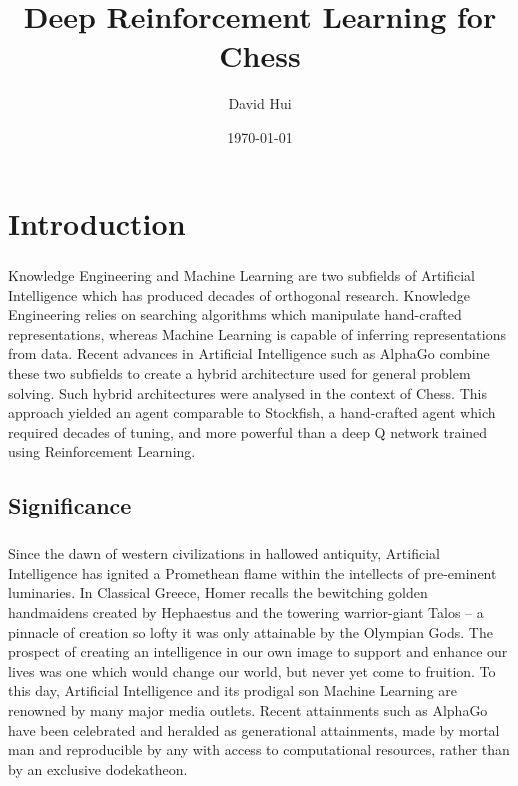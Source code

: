 \documentclass[a4paper]{book}
\title{Deep Reinforcement Learning for Chess}
\date{\today}
\author{David Hui}
\begin{document}
\maketitle
\tableofcontents


\chapter{Introduction}

\paragraph{} Knowledge Engineering and Machine Learning are two subfields of Artificial Intelligence which has produced decades of orthogonal research. Knowledge Engineering relies on searching algorithms which manipulate hand-crafted representations, whereas Machine Learning is capable of inferring representations from data. Recent advances in Artificial Intelligence such as AlphaGo combine these two subfields to create a hybrid architecture used for general problem solving. Such hybrid architectures were analysed in the context of Chess. This approach yielded an agent comparable to Stockfish, a hand-crafted agent which required decades of tuning, and more powerful than a deep Q network trained using Reinforcement Learning.

\section{Significance}

\paragraph{}

\paragraph{} Since the dawn of western civilizations in hallowed antiquity, Artificial Intelligence has ignited a Promethean flame within the intellects of pre-eminent luminaries. In Classical Greece, Homer recalls the bewitching golden handmaidens created by Hephaestus and the towering warrior-giant Talos -- a pinnacle of creation so lofty it was only attainable by the Olympian Gods. The prospect of creating an intelligence in our own image to support and enhance our lives was one which would change our world, but never yet come to fruition. To this day, Artificial Intelligence and its prodigal son Machine Learning are renowned by many major media outlets. Recent attainments such as AlphaGo have been celebrated and heralded as generational attainments, made by mortal man and reproducible by any with access to computational resources, rather than by an exclusive dodekatheon.
\end{document}
